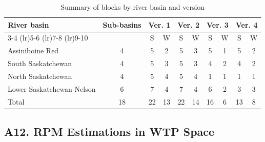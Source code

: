\documentclass[12pt]{article}
\begin{document}
\begin{table}[ht]
\renewcommand{\thetable}{A3.1} %
\centering
\caption{Summary of blocks by river basin and version}
\label{tab:blocks_summary}
\small %
\begin{tabular}{lccccccccc}
\toprule
\multirow{2}{*}{River basin} & \multirow{2}{*}{Sub-basins} & \multicolumn{2}{c}{Ver. 1} & \multicolumn{2}{c}{Ver. 2} & \multicolumn{2}{c}{Ver. 3} & \multicolumn{2}{c}{Ver. 4} \\
\cmidrule(lr){3-4} \cmidrule(lr){5-6} \cmidrule(lr){7-8} \cmidrule(lr){9-10}
 & & S & W & S & W & S & W & S & W \\
\midrule
Assiniboine Red & 4 & 5 & 2 & 5 & 3 & 5 & 1 & 5 & 2 \\
South Saskatchewan & 4 & 5 & 3 & 5 & 3 & 4 & 2 & 4 & 2 \\
North Saskatchewan & 4 & 5 & 4 & 5 & 4 & 1 & 1 & 1 & 1 \\
Lower Saskatchewan Nelson & 6 & 7 & 4 & 7 & 4 & 6 & 2 & 3 & 3 \\
\midrule
Total & 18 & 22 & 13 & 22 & 14 & 16 & 6 & 13 & 8 \\
\bottomrule
\end{tabular}
\end{table}



\clearpage
\subsection*{A12. RPM Estimations in WTP Space}



 

% 






\newpage

\end{document}
